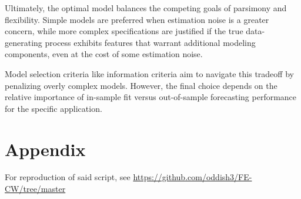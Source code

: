\documentclass{article}
\begin{document}
Ultimately, the optimal model balances the competing goals of parsimony and flexibility. Simple models are preferred when estimation noise is a greater concern, while more complex specifications are justified if the true data-generating process exhibits features that warrant additional modeling components, even at the cost of some estimation noise.

Model selection criteria like information criteria aim to navigate this tradeoff by penalizing overly complex models. However, the final choice depends on the relative importance of in-sample fit versus out-of-sample forecasting performance for the specific application.

\newpage
\section*{Appendix}

For reproduction of said script, see \url{https://github.com/oddish3/FE-CW/tree/master}


\end{document}

